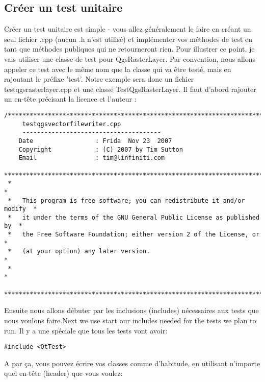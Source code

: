 \subsection{Créer un test unitaire}
Créer un test unitaire est simple - vous allez généralement le faire en créant un seul fichier .cpp (aucun .h n'est utilisé) et implémenter vos méthodes de test en tant que méthodes publiques qui ne retourneront rien. Pour illustrer ce point, je vais utiliser une classe de test pour QgsRasterLayer. Par convention, nous allons appeler ce test avec le même nom que la classe qui va être testé, mais en rajoutant le préfixe 'test'. Notre exemple sera donc un fichier testqgsrasterlayer.cpp et une classe TestQgsRasterLayer. Il faut d'abord rajouter un en-tête précisant la licence et l'auteur :

\newpage

\begin{verbatim}
/***************************************************************************
     testqgsvectorfilewriter.cpp
     --------------------------------------
    Date                 : Frida  Nov 23  2007
    Copyright            : (C) 2007 by Tim Sutton
    Email                : tim@linfiniti.com
 ***************************************************************************
 *                                                                         *
 *   This program is free software; you can redistribute it and/or modify  *
 *   it under the terms of the GNU General Public License as published by  *
 *   the Free Software Foundation; either version 2 of the License, or     *
 *   (at your option) any later version.                                   *
 *                                                                         *
 ***************************************************************************/
\end{verbatim}

Ensuite nous allons débuter par les inclusions (includes) nécessaires aux tests que nous voulons faire.Next we use start our includes needed for the tests we plan to run. Il y a une spéciale que tous les tests vont avoir:

\begin{verbatim}
#include <QtTest>
\end{verbatim}

A par ça, vous pouvez écrire vos classes comme d'habitude, en utilisant n'importe quel en-tête (header) que vous voulez:

